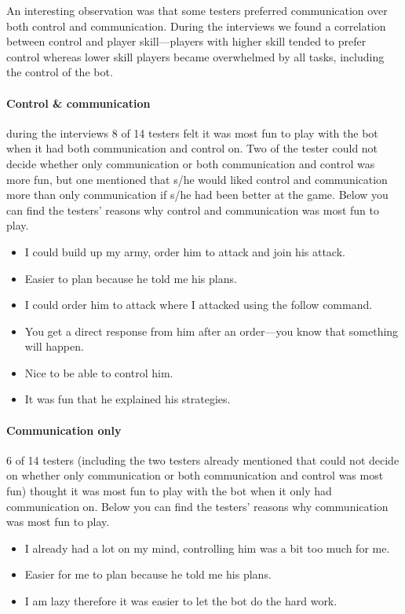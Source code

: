 An interesting observation was that some testers preferred communication over both control and
communication. During the interviews we found a correlation between control and player skill—players
with higher skill tended to prefer control whereas lower skill players became overwhelmed by all
tasks, including the control of the bot.





\paragraph{Control \& communication}
during the interviews 8 of 14 testers felt it was most fun to play with the bot when it had both
communication and control on. Two of the tester could not decide whether only communication or both
communication and control was more fun, but one mentioned that s/he would liked control and
communication more than only communication if s/he had been better at the game. Below you can find
the testers' reasons why control and communication was most fun to play.
\begin{itemize}
	\item I could build up my army, order him to attack and join his attack.
	\item Easier to plan because he told me his plans.
	\item I could order him to attack where I attacked using the follow command.
	\item You get a direct response from him after an order—you know that something will happen.
	\item Nice to be able to control him.
	\item It was fun that he explained his strategies.
\end{itemize}

\paragraph{Communication only}
6 of 14 testers (including the two testers already mentioned that could not decide on whether only
communication or both communication and control was most fun) thought it was most fun to play with
the bot when it only had communication on. Below you can find the testers' reasons why communication
was most fun to play.
\begin{itemize}
	\item I already had a lot on my mind, controlling him was a bit too much for me.	
	\item Easier for me to plan because he told me his plans.
	\item I am lazy therefore it was easier to let the bot do the hard work.
\end{itemize}

